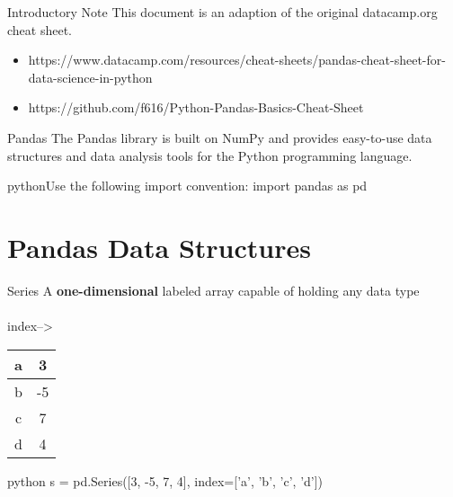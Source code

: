 \begin{alerttextbox}{Introductory Note}
This document is an adaption of the original datacamp.org cheat sheet.\\
\begin{itemize}
    \item https://www.datacamp.com/resources/cheat-sheets/pandas-cheat-sheet-for-data-science-in-python
    \item https://github.com/f616/Python-Pandas-Basics-Cheat-Sheet
\end{itemize}

\end{alerttextbox}


\begin{textbox}{Pandas}
The Pandas library is built on NumPy and provides easy-to-use data structures and data analysis tools for the Python programming language.
\end{textbox}

\begin{codebox}{python}{Use the following import convention:}
import pandas as pd
\end{codebox}

\section{Pandas Data Structures}

\begin{myblock}{Series}
A \textbf{one-dimensional} labeled array capable of holding any data type\\\\

{index-->}\hspace{0.5cm}
\begin{tabular}{ |c|c| } 
\hline
 \cellcolor[HTML]{FFFFFF} a & 3\\
  \hline
 \cellcolor[HTML]{FFFFFF} b & -5\\
  \hline
 \cellcolor[HTML]{FFFFFF} c & 7\\
  \hline
 \cellcolor[HTML]{FFFFFF} d & 4\\
 \hline
\end{tabular}
\end{myblock}

\begin{codebox}{python}{}
s = pd.Series([3, -5, 7, 4], index=['a', 'b', 'c', 'd'])
\end{codebox}

